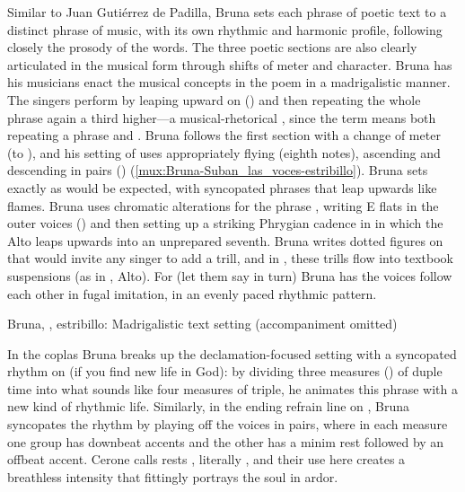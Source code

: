 Similar to Juan Gutiérrez de Padilla, Bruna sets each phrase of poetic text to
a distinct phrase of music, with its own rhythmic and harmonic profile,
following closely the prosody of the words.  
The three poetic sections are also clearly articulated in the musical form
through shifts of meter and character.
Bruna has his musicians enact the musical concepts in the poem in a
madrigalistic manner.  
The singers perform  by leaping upward on
 () and then repeating the whole phrase again a
third higher---a musical-rhetorical , since the term means both
repeating a phrase and .
Bruna follows the first section with a change of meter (to \meterC), and his
setting of  uses appropriately
flying  (eighth notes), ascending and descending in pairs
() (\cref{mux:Bruna-Suban_las_voces-estribillo}).
Bruna sets  exactly as would be expected, with
syncopated phrases that leap upwards like flames.
Bruna uses chromatic alterations for the phrase ,
writing E flats in the outer voices () and then setting up a
striking Phrygian cadence in  in which the Alto leaps upwards
into an unprepared seventh.  
Bruna writes dotted figures on  that would
invite any singer to add a trill, and in , these trills flow
into textbook suspensions (as in , Alto).
For  (let them say in turn) Bruna has the voices follow
each other in fugal imitation, in an evenly paced rhythmic pattern.


{Bruna, , estribillo: Madrigalistic text setting
(accompaniment omitted)}

In the coplas Bruna breaks up the declamation-focused setting with a syncopated
rhythm on  (if you find new life in God):
by dividing three measures () of duple time into what sounds
like four measures of triple, he animates this phrase with a new kind of
rhythmic life. 
Similarly, in the ending refrain line on , Bruna syncopates the
rhythm by playing off the voices in pairs, where in each measure one group has
downbeat accents and the other has a minim rest followed by an offbeat accent.
Cerone calls rests , literally , and their use
here creates a breathless intensity that fittingly portrays the soul in ardor.%
    \citXXX[Cerone]

